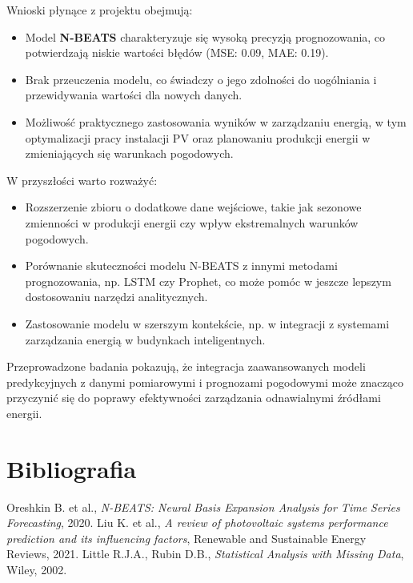 \documentclass[a4paper,fleqn,final]{cas-dc}\usepackage[authoryear,longnamesfirst]{natbib}
\begin{document}
Wnioski płynące z projektu obejmują:
\begin{itemize}
    \item Model \textbf{N-BEATS} charakteryzuje się wysoką precyzją prognozowania, co potwierdzają niskie wartości błędów (MSE: 0.09, MAE: 0.19).
    \item Brak przeuczenia modelu, co świadczy o jego zdolności do uogólniania i przewidywania wartości dla nowych danych.
    \item Możliwość praktycznego zastosowania wyników w zarządzaniu energią, w tym optymalizacji pracy instalacji PV oraz planowaniu produkcji energii w zmieniających się warunkach pogodowych.
\end{itemize}

W przyszłości warto rozważyć:
\begin{itemize}
    \item Rozszerzenie zbioru o dodatkowe dane wejściowe, takie jak sezonowe zmienności w produkcji energii czy wpływ ekstremalnych warunków pogodowych.
    \item Porównanie skuteczności modelu N-BEATS z innymi metodami prognozowania, np. LSTM czy Prophet, co może pomóc w jeszcze lepszym dostosowaniu narzędzi analitycznych.
    \item Zastosowanie modelu w szerszym kontekście, np. w integracji z systemami zarządzania energią w budynkach inteligentnych.
\end{itemize}

Przeprowadzone badania pokazują, że integracja zaawansowanych modeli predykcyjnych z danymi pomiarowymi i prognozami pogodowymi może znacząco przyczynić się do poprawy efektywności zarządzania odnawialnymi źródłami energii.


\section{Bibliografia}
\begin{thebibliography}{9}
 Oreshkin B. et al., \textit{N-BEATS: Neural Basis Expansion Analysis for Time Series Forecasting}, 2020.
 Liu K. et al., \textit{A review of photovoltaic systems performance prediction and its influencing factors}, Renewable and Sustainable Energy Reviews, 2021.
 Little R.J.A., Rubin D.B., \textit{Statistical Analysis with Missing Data}, Wiley, 2002.
\end{thebibliography}
\end{document}
